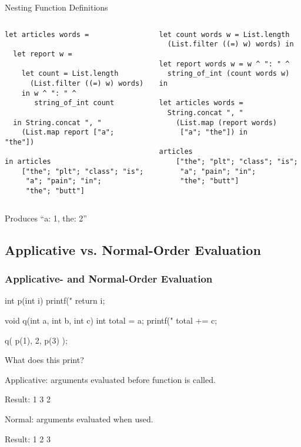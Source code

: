 \documentclass{plt}
\begin{document}
\begin{frame}[fragile]{Nesting Function Definitions}

\begin{columns}
  \begin{column}{0.5\textwidth}
\shadowstart
\begin{lstlisting}[language=caml,morendkeywords={words},ndkeywordstyle={\itshape\color{red}}]
let articles words =

  let report w =

    let count = List.length
      (List.filter ((=) w) words)
    in w ^ ": " ^
       string_of_int count

  in String.concat ", "
    (List.map report ["a"; "the"])

in articles
    ["the"; "plt"; "class"; "is";
     "a"; "pain"; "in";
     "the"; "butt"]
\end{lstlisting}
\shadowend
  \end{column}
  \begin{column}{0.5\textwidth}
\shadowstart
\begin{lstlisting}[language=caml,morendkeywords={words},ndkeywordstyle={\itshape\color{red}}]
let count words w = List.length
  (List.filter ((=) w) words) in

let report words w = w ^ ": " ^
  string_of_int (count words w) in

let articles words =
  String.concat ", "
    (List.map (report words)
     ["a"; "the"]) in

articles
    ["the"; "plt"; "class"; "is";
     "a"; "pain"; "in";
     "the"; "butt"]
\end{lstlisting}
\shadowend
  \end{column}
\end{columns}

Produces ``a: 1, the: 2''

\end{frame}

\subsection{Applicative vs. Normal-Order Evaluation}

\begin{frame}[fragile=singleslide]
  \frametitle{Applicative- and Normal-Order Evaluation}

\begin{C}
int p(int i) {
   printf("%
   return i;
}

void q(int a, int b, int c)
{
  int total = a;
  printf("%
  total += c;
}

q( p(1), 2, p(3) );
\end{C}

What does this print?

\pause

Applicative: arguments evaluated before function is called.

Result: 1 3 2

Normal: arguments evaluated when used.

Result: 1 2 3

\end{frame}
\end{document}
